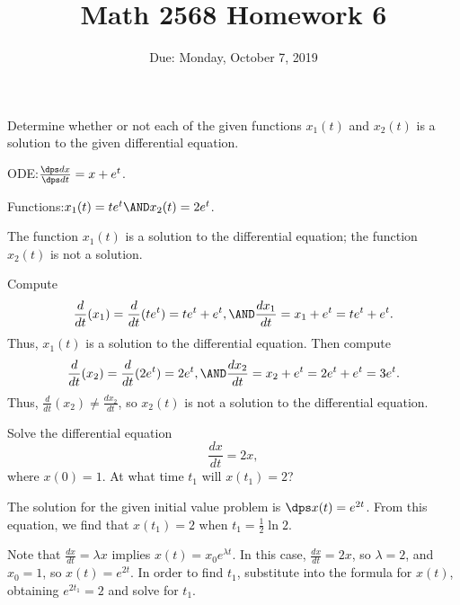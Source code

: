 \documentclass{article}
\title{Math 2568 Homework 6}
\author{\phantom{Dr. Golubitsky}}
\date{Due: Monday, October 7, 2019}
\begin{document}
\maketitle


\problemlabel

\noindent Determine whether or not each of the given functions $x_1(t)$ and $x_2(t)$ is a solution  to the given differential equation.

\begin{exercise}  \label{c3.1.bb}
ODE:\quad $\frac{\dps dx}{\dps dt} = x + e^t$.

Functions:\quad $x_1(t)=te^t \AND x_2(t)= 2e^t$.

\begin{solution}

\ans The function $x_1(t)$ is a solution to the differential equation;
the function $x_2(t)$ is not a solution.

\soln Compute
\[
\frac{d}{dt}(x_1) = \frac{d}{dt}(te^t) = te^t + e^t, \AND
\frac{dx_1}{dt} = x_1 + e^t = te^t + e^t.
\]
Thus, $x_1(t)$ is a solution to the differential equation.  Then compute
\[
\frac{d}{dt}(x_2) = \frac{d}{dt}(2e^t) = 2e^t, \AND
\frac{dx_2}{dt} = x_2 + e^t = 2e^t + e^t = 3e^t.
\]
Thus, $\frac{d}{dt}(x_2) \neq \frac{dx_2}{dt}$, so $x_2(t)$ is not a
solution to the differential equation.

\end{solution}
\end{exercise}





\problemlabel



\begin{exercise} \label{c3.1.1}
Solve the differential equation
\[
\frac{dx}{dt} = 2x,
\]
where $x(0)=1$.  At what time $t_1$ will $x(t_1)=2$?

\begin{solution}

\ans The solution for the given initial value problem is
$\dps x(t) = e^{2t}$.  From this equation, we find that $x(t_1) = 2$
when $t_1 = \frac{1}{2}\ln 2$.

\soln Note that $\frac{dx}{dt} = \lambda x$ implies $x(t) =
x_0e^{\lambda t}$.  In this case, $\frac{dx}{dt} = 2x$, so
$\lambda = 2$, and $x_0 = 1$, so $x(t) = e^{2t}$.  In order to
find $t_1$, substitute into the formula for $x(t)$, obtaining
$e^{2t_1} = 2$ and solve for $t_1$.

\end{solution}
\end{exercise}
\end{document}
